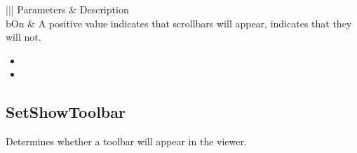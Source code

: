 \documentclass[letterpaper,12pt,english,openany,oneside]{sphinxmanual}
\begin{document}
\begin{savenotes}\sphinxattablestart
\centering
{}\label{\detokenize{IAC_API_OLE_Objects:section-104}}\nobreak
\begin{tabular}[t]{|||}
\hline
\sphinxstyletheadfamily 
Parameters
&\sphinxstyletheadfamily 
Description
\\
\hline
bOn
&
A positive value indicates that scrollbars will appear,  indicates that they will not.
\\
\hline
\end{tabular}
\par
\sphinxattableend\end{savenotes}
\label{\detokenize{IAC_API_OLE_Objects:related-methods-150}}
\begin{itemize}
\item {} 
 

\item {} 
 

\end{itemize}




\subsection{SetShowToolbar}
\label{\detokenize{IAC_API_OLE_Objects:setshowtoolbar}}
Determines whether a toolbar will appear in the viewer.


\begin{sphinxVerbatim}[commandchars=\\\{\}]
  
\end{sphinxVerbatim}
\label{\detokenize{IAC_API_OLE_Objects:parameters-90}}
\end{document}
